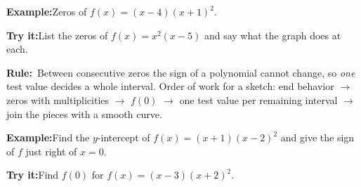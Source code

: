 \documentclass[12pt]{article}
\begin{document}
\begin{examplebox}\textbf{Example:}\quad Zeros of $f(x) = (x - 4)(x + 1)^2$.
\end{examplebox}

\begin{tryitbox}\textbf{Try it:}\quad List the zeros of $f(x) = x^2(x - 5)$ and
say what the graph does at each.\\[2pt]
\end{tryitbox}


\begin{formulabox}\textbf{Rule:}\ Between consecutive zeros the sign of a
polynomial cannot change, so \emph{one} test value decides a whole interval.
Order of work for a sketch: end behavior $\to$ zeros with multiplicities $\to$
$f(0)$ $\to$ one test value per remaining interval $\to$ join the pieces with a
smooth curve.
\end{formulabox}

\begin{examplebox}\textbf{Example:}\quad Find the $y$-intercept of
$f(x) = (x + 1)(x - 2)^2$ and give the sign of $f$ just right of $x = 0$.
\end{examplebox}

\begin{tryitbox}\textbf{Try it:}\quad Find $f(0)$ for
$f(x) = (x - 3)(x + 2)^2$.
\ \end{tryitbox}
\end{document}
